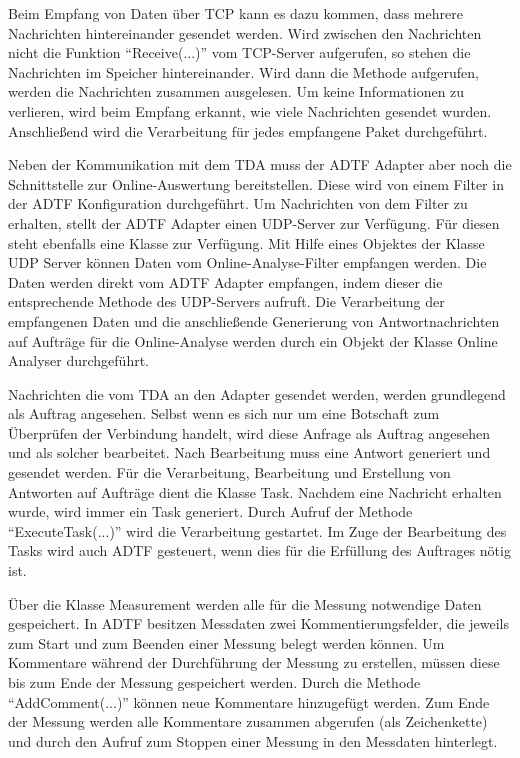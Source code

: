 \documentclass[12pt,a4paper]{report}
\begin{document}
Beim Empfang von Daten über TCP kann es dazu kommen, dass mehrere Nachrichten hintereinander gesendet werden. Wird zwischen den Nachrichten nicht die Funktion "`Receive(...)"' vom TCP-Server aufgerufen, so stehen die Nachrichten im Speicher hintereinander. Wird dann die Methode aufgerufen, werden die Nachrichten zusammen ausgelesen. Um keine Informationen zu verlieren, wird beim Empfang erkannt, wie viele Nachrichten gesendet wurden. Anschließend wird die Verarbeitung für jedes empfangene Paket durchgeführt.

Neben der Kommunikation mit dem TDA muss der ADTF Adapter aber noch die Schnittstelle zur Online-Auswertung bereitstellen. Diese wird von einem Filter in der ADTF Konfiguration durchgeführt. Um Nachrichten von dem Filter zu erhalten, stellt der ADTF Adapter einen UDP-Server zur Verfügung. Für diesen steht ebenfalls eine Klasse zur Verfügung. Mit Hilfe eines Objektes der Klasse UDP Server können Daten vom Online-Analyse-Filter empfangen werden. Die Daten werden direkt vom ADTF Adapter empfangen, indem dieser die entsprechende Methode des UDP-Servers aufruft. Die Verarbeitung der empfangenen Daten und die anschließende Generierung von Antwortnachrichten auf Aufträge für die Online-Analyse werden durch ein Objekt der Klasse Online Analyser durchgeführt.

Nachrichten die vom TDA an den Adapter gesendet werden, werden grundlegend als Auftrag angesehen. Selbst wenn es sich nur um eine Botschaft zum Überprüfen der Verbindung handelt, wird diese Anfrage als Auftrag angesehen und als solcher bearbeitet. Nach Bearbeitung muss eine Antwort generiert und gesendet werden. Für die Verarbeitung, Bearbeitung und Erstellung von Antworten auf Aufträge dient die Klasse Task. Nachdem eine Nachricht erhalten wurde, wird immer ein Task generiert. Durch Aufruf der Methode "`ExecuteTask(...)"' wird die Verarbeitung gestartet. Im Zuge der Bearbeitung des Tasks wird auch ADTF gesteuert, wenn dies für die Erfüllung des Auftrages nötig ist.

Über die Klasse Measurement werden alle für die Messung notwendige Daten gespeichert. In ADTF besitzen Messdaten zwei Kommentierungsfelder, die jeweils zum Start und zum Beenden einer Messung belegt werden können. Um Kommentare während der Durchführung der Messung zu erstellen, müssen diese bis zum Ende der Messung gespeichert werden. Durch die Methode "`AddComment(...)"' können neue Kommentare hinzugefügt werden. Zum Ende der Messung werden alle Kommentare zusammen abgerufen (als Zeichenkette) und durch den Aufruf zum Stoppen einer Messung in den Messdaten hinterlegt.
\end{document}
